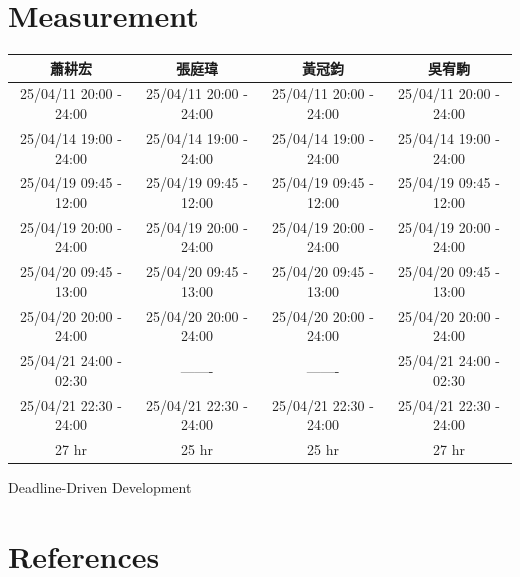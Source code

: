 \documentclass[12pt]{article}
\begin{document}
\section{Measurement}
\begin{CJK*}{UTF8}{bsmi} %

\begin{longtable}{|c|c|c|c|}
\hline
蕭耕宏 & 張庭瑋 & 黃冠鈞 & 吳宥駒 \\
\hline
\endfirsthead
\endhead

\hline
25/04/11 20:00 - 24:00 & 25/04/11 20:00 - 24:00 & 25/04/11 20:00 - 24:00 & 25/04/11 20:00 - 24:00 \\
\hline
25/04/14 19:00 - 24:00 & 25/04/14 19:00 - 24:00 & 25/04/14 19:00 - 24:00 & 25/04/14 19:00 - 24:00 \\
\hline
25/04/19 09:45 - 12:00 & 25/04/19 09:45 - 12:00 & 25/04/19 09:45 - 12:00 & 25/04/19 09:45 - 12:00 \\
\hline
25/04/19 20:00 - 24:00 & 25/04/19 20:00 - 24:00 & 25/04/19 20:00 - 24:00 & 25/04/19 20:00 - 24:00 \\
\hline
25/04/20 09:45 - 13:00 & 25/04/20 09:45 - 13:00 & 25/04/20 09:45 - 13:00 & 25/04/20 09:45 - 13:00 \\
\hline
25/04/20 20:00 - 24:00 & 25/04/20 20:00 - 24:00 & 25/04/20 20:00 - 24:00 & 25/04/20 20:00 - 24:00 \\
\hline
25/04/21 24:00 - 02:30 & ------- & ------- & 25/04/21 24:00 - 02:30 \\
\hline
25/04/21 22:30 - 24:00 & 25/04/21 22:30 - 24:00 & 25/04/21 22:30 - 24:00 & 25/04/21 22:30 - 24:00 \\
\hline
27 hr   & 25 hr & 25 hr & 27 hr \\
\hline


\end{longtable}
\end{CJK*}

Deadline-Driven Development


\section*{References}

\nocite{Siepe2024}
\printbibliography[heading=none]
\end{document}
